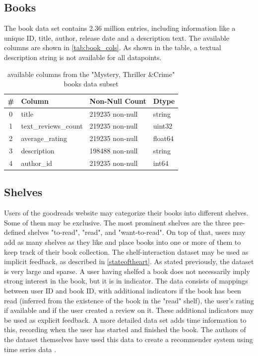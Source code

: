 \documentclass[10pt,final,journal,a4paper,oneside,twocolumn]{IEEEtran}
\begin{document}
\subsection{Books}
The book data set contains 2.36 million entries, including information like a unique ID, title, author, release date and a description text. The available columns are shown in \autoref{tab:book_cols}. As shown in the table, a textual description string is not available for all datapoints.
\begin{table}[h]        
    \begin{center}
        \begin{tabular}{clll}
            \toprule
            \# & Column & Non-Null Count & Dtype \\
            \midrule
            0 & title & 219235 non-null & string \\
            1 & text\_reviews\_count & 219235 non-null & uint32 \\
            2 & average\_rating & 219235 non-null & float64 \\
            3 & description & 198488 non-null & string \\
            4 & author\_id & 219235 non-null & int64 \\
            \bottomrule
        \end{tabular}
    \end{center}
\caption{available columns from the "Mystery, Thriller \&Crime" books data subset}
\label{tab:book_cols}
\end{table}
    

\subsection{Shelves}
Users of the goodreads website may categorize their books into different shelves. Some of them may be exclusive. The most prominent shelves are the three pre-defined shelves "to-read", "read", and "want-to-read". On top of that, users may add as many shelves as they like and place books into one or more of them to keep track of their book collection.
The shelf-interaction dataset may be used as implicit feedback, as described in \autoref{stateoftheart}. As stated previously, the dataset is very large and sparse. A user having shelfed a book does not necessarily imply strong interest in the book, but it is in indicator. 
The data consists of mappings between user ID and book ID, with additional indicators if the book has been read (inferred from the existence of the book in the "read" shelf), the user's rating if available and if the user created a review on it. These additional indicators may be used as explicit feedback.
A more detailed data set adds time information to this, recording when the user has started and finished the book. The authors of the dataset themselves have used this data to create a recommender system using time series data \cite{Pera.2018}.
\end{document}
